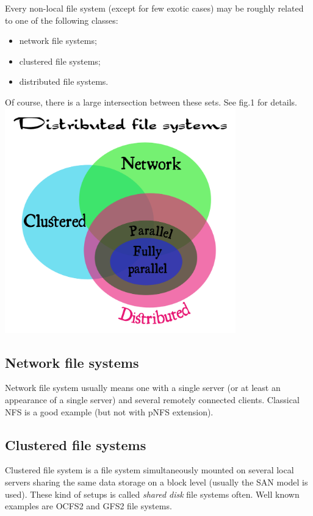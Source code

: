 \documentclass[10pt, a5paper]{article}
\begin{document}
{Every non-local file system (except for few exotic cases) may be roughly related to one of the following classes:

\begin{itemize}
  \item network file systems;
  \item clustered file systems;
  \item distributed file systems.
\end{itemize}

Of course, there is a large intersection between these sets. See fig.1 for details.
\includegraphics[width=10cm]{123_genesis.png}

\subsection*{Network file systems}

Network file system usually means one with a single server (or at least an appearance of a single server) and several remotely connected clients. Classical NFS\cite{bib3} is a good example (but not with pNFS\cite{bib4} extension).

\subsection*{Clustered file systems}

Clustered file system is a file system simultaneously mounted on several local servers sharing the same data storage on a block level (usually the SAN\cite{bib5} model is used). These kind of setups is called \emph{shared disk} file systems often. Well known examples are OCFS2\cite{bib6} and GFS2\cite{bib7} file systems.

}
\end{document}

